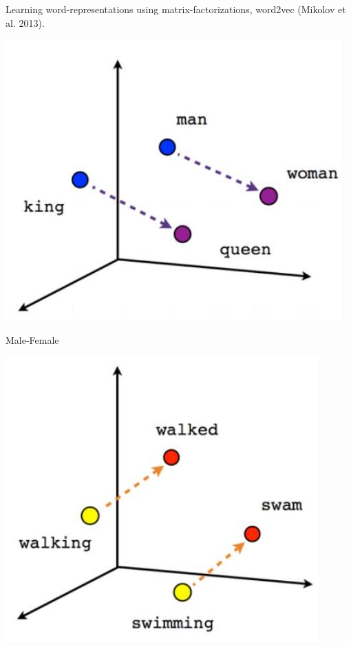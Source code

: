 \documentclass[10pt]{article}
\begin{document}
Learning word-representations using matrix-factorizations, word2vec (Mikolov et al. 2013).

\begin{center}
\includegraphics[max width=\textwidth]{2024_01_08_e090cb7d953bac87fc33g-03(2)}
\end{center}

Male-Female

\begin{center}
\includegraphics[max width=\textwidth]{2024_01_08_e090cb7d953bac87fc33g-03(1)}
\end{center}
\end{document}
